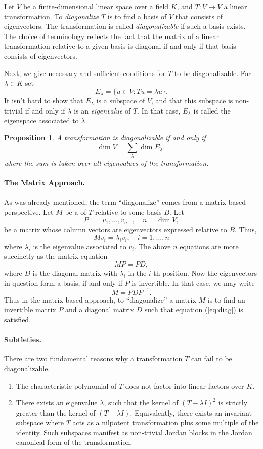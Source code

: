 \documentclass{article}
\newtheorem{proposition}{Proposition}
\begin{document}
Let $V$ be a finite-dimensional linear space over a field $K$, and
$T:V\rightarrow V$ a linear transformation. To {\em diagonalize} $T$
is to find a basis of $V$ that consists of eigenvectors. The
transformation is called {\em diagonalizable} if such a basis exists.
The choice of terminology reflects the fact that
the matrix of a linear transformation relative to a given basis is  diagonal
if and only if that basis consists of
eigenvectors.

Next, we give necessary and sufficient conditions for $T$ to be
diagonalizable. For $\lambda\in K$ set
$$E_\lambda = \{ u\in V: Tu = \lambda u\}.$$
It isn't hard to show that $E_\lambda$ is a subspace of $V$, and that this subspace is
non-trivial if and only if $\lambda$ is an {\em eigenvalue} of $T$.  In that case, $E_\lambda$ is called the eigenspace
associated to $\lambda$. 
\begin{proposition}
A transformation is diagonalizable if and only if
$$\dim V = \sum_\lambda \dim E_\lambda,$$
where the sum is taken over all eigenvalues of the transformation.
\end{proposition}

\paragraph{The Matrix Approach.}
As was already mentioned, the  term  ``diagonalize'' comes from a matrix-based perspective.  Let
$M$ be a  of $T$ relative to some basis $B$.  Let
$$P=[v_1,\ldots,v_n],\quad n=\dim V,$$
be a matrix whose column vectors are eigenvectors expressed relative
to $B$.  Thus,
$$M v_i = \lambda_i v_i,\quad i=1,\ldots,n$$
where $\lambda_i$ is the eigenvalue associated to $v_i$.  The above
$n$ equations are more succinctly as the matrix equation
$$MP = PD,$$
where $D$ is the diagonal matrix with $\lambda_i$ in the $i$-th
position.  Now the eigenvectors in question form a basis, if and only
if $P$ is invertible.  In that case, we may write
\begin{equation}
  \label{eq:diag}
  M=PDP^{-1}.  
\end{equation}
Thus in the matrix-based approach, to ``diagonalize'' a matrix $M$ is
to find an invertible matrix $P$ and a diagonal matrix $D$ such that
equation (\ref{eq:diag}) is satisfied.  


\paragraph{Subtleties.}
There are two fundamental reasons why a transformation $T$ can fail to
be diagonalizable.
\begin{enumerate}
\item The characteristic polynomial of $T$ does not factor into linear
factors over $K$.
\item There exists an eigenvalue $\lambda$, such that the kernel of
$(T-\lambda I)^2$ is strictly greater than the kernel of $(T-\lambda
I)$. Equivalently, there exists an invariant subspace where $T$
acts as a nilpotent transformation plus some multiple of the
identity. Such subspaces manifest as non-trivial Jordan blocks in the Jordan canonical form of the transformation.\end{enumerate}
\end{document}
